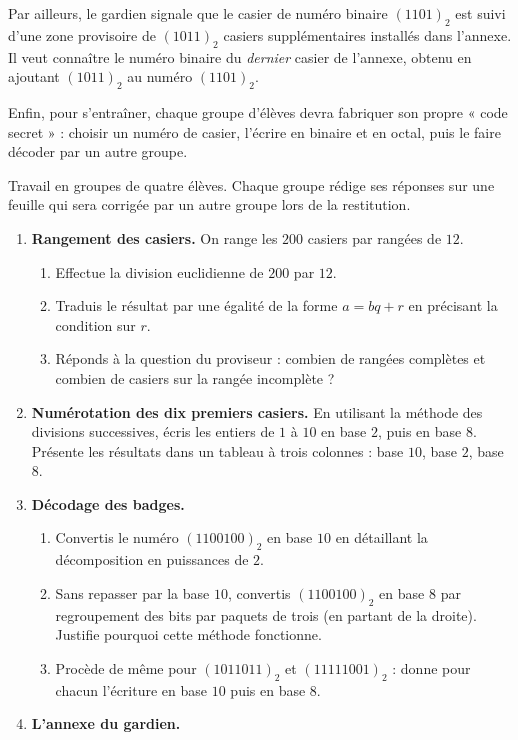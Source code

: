 \documentclass[11pt]{article}
\newcounter{popsec}
\newcounter{popsub}
\newcommand{\courssub}[1]{%
  \stepcounter{popsub}%
  \par\vspace{9pt}\noindent{\popxbold\fontsize{11.5}{13}\selectfont\color{popink}{\color{poporange}\thepopsec.\thepopsub}\hspace{6pt}#1}\par\nopagebreak\vspace{4pt}
}
\begin{document}
Par ailleurs, le gardien signale que le casier de numéro binaire $(1101)_2$ est suivi d'une zone provisoire de $(1011)_2$ casiers supplémentaires installés dans l'annexe. Il veut connaître le numéro binaire du \emph{dernier} casier de l'annexe, obtenu en ajoutant $(1011)_2$ au numéro $(1101)_2$.

Enfin, pour s'entraîner, chaque groupe d'élèves devra fabriquer son propre « code secret » : choisir un numéro de casier, l'écrire en binaire et en octal, puis le faire décoder par un autre groupe.

\courssub{Consignes}

Travail en groupes de quatre élèves. Chaque groupe rédige ses réponses sur une feuille qui sera corrigée par un autre groupe lors de la restitution.

\begin{enumerate}
\item \textbf{Rangement des casiers.} On range les $200$ casiers par rangées de $12$.
\begin{enumerate}
\item Effectue la division euclidienne de $200$ par $12$.
\item Traduis le résultat par une égalité de la forme $a = bq + r$ en précisant la condition sur $r$.
\item Réponds à la question du proviseur : combien de rangées complètes et combien de casiers sur la rangée incomplète ?
\end{enumerate}
\item \textbf{Numérotation des dix premiers casiers.} En utilisant la méthode des divisions successives, écris les entiers de $1$ à $10$ en base $2$, puis en base $8$. Présente les résultats dans un tableau à trois colonnes : base $10$, base $2$, base $8$.
\item \textbf{Décodage des badges.}
\begin{enumerate}
\item Convertis le numéro $(1100100)_2$ en base $10$ en détaillant la décomposition en puissances de $2$.
\item Sans repasser par la base $10$, convertis $(1100100)_2$ en base $8$ par regroupement des bits par paquets de trois (en partant de la droite). Justifie pourquoi cette méthode fonctionne.
\item Procède de même pour $(1011011)_2$ et $(11111001)_2$ : donne pour chacun l'écriture en base $10$ puis en base $8$.
\end{enumerate}
\item \textbf{L'annexe du gardien.}

\end{enumerate}
\end{document}
